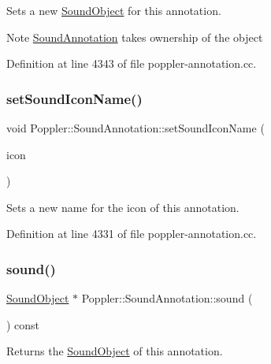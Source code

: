 Sets a new \hyperlink{class_poppler_1_1_sound_object}{Sound\+Object} for this annotation.

\begin{DoxyNote}{Note}
\hyperlink{class_poppler_1_1_sound_annotation}{Sound\+Annotation} takes ownership of the object 
\end{DoxyNote}


Definition at line 4343 of file poppler-\/annotation.\+cc.

\mbox{\label{class_poppler_1_1_sound_annotation_a704b034328ff00f43f9f050ba1765f56}} 
\subsubsection{\texorpdfstring{set\+Sound\+Icon\+Name()}{setSoundIconName()}}
{\footnotesize\ttfamily void Poppler\+::\+Sound\+Annotation\+::set\+Sound\+Icon\+Name (\begin{DoxyParamCaption}\item[{const Q\+String \&}]{icon }\end{DoxyParamCaption})}

Sets a new name for the icon of this annotation. 

Definition at line 4331 of file poppler-\/annotation.\+cc.

\mbox{\label{class_poppler_1_1_sound_annotation_a91dc567a9d1848f7c9cd0327c7f83fd9}} 
\subsubsection{\texorpdfstring{sound()}{sound()}}
{\footnotesize\ttfamily \hyperlink{class_poppler_1_1_sound_object}{Sound\+Object} $\ast$ Poppler\+::\+Sound\+Annotation\+::sound (\begin{DoxyParamCaption}{ }\end{DoxyParamCaption}) const}

Returns the \hyperlink{class_poppler_1_1_sound_object}{Sound\+Object} of this annotation. 

